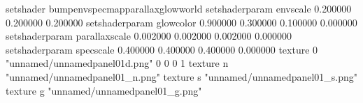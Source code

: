setshader bumpenvspecmapparallaxglowworld
setshaderparam envscale 0.200000 0.200000 0.200000
setshaderparam glowcolor 0.900000 0.300000 0.100000 0.000000
setshaderparam parallaxscale 0.002000 0.002000 0.002000 0.000000
setshaderparam specscale 0.400000 0.400000 0.400000 0.000000
texture 0 "unnamed/unnamedpanel01d.png" 0 0 0 1
texture n "unnamed/unnamedpanel01_n.png"
texture s "unnamed/unnamedpanel01_s.png"
texture g "unnamed/unnamedpanel01_g.png"